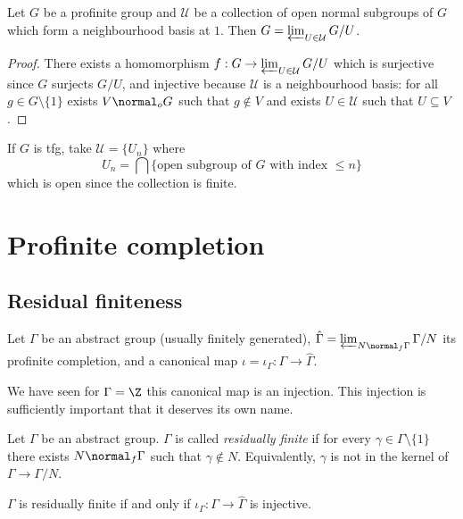 \documentclass[a4paper]{article}
\begin{document}
\begin{proposition}
  Let \(G\) be a profinite group and \(\mathcal U\) be a collection of open normal subgroups of \(G\) which form a neighbourhood basis at \(1\). Then \(G = \varprojlim_{U \in \mathcal U} G/U\).
\end{proposition}

\begin{proof}
  There exists a homomorphism \(f: G \to \varprojlim_{U \in \mathcal U} G/U\) which is surjective since \(G\) surjects \(G/U\), and injective because \(\mathcal U\) is a neighbourhood basis: for all \(g \in G \setminus \{1\}\) exists \(V \normal_o G\) such that \(g \notin V\) and exists \(U \in \mathcal U\) such that \(U \subseteq V\).
\end{proof}

\begin{eg}
  If \(G\) is tfg, take \(\mathcal U = \{U_n\}\) where
  \[
    U_n = \bigcap \{\text{open subgroup of \(G\) with index \(\leq n\)}\}
  \]
  which is open since the collection is finite.
\end{eg}

\section{Profinite completion}

\subsection{Residual finiteness}

Let \(\Gamma\) be an abstract group (usually finitely generated), \(\hat \Gamma = \varprojlim_{N \normal_f \Gamma} \Gamma/N\) its profinite completion, and a canonical map \(\iota = \iota_\Gamma: \Gamma \to \hat \Gamma\).

We have seen for \(\Gamma = \Z\) this canonical map is an injection. This injection is sufficiently important that it deserves its own name.

\begin{definition}
  Let \(\Gamma\) be an abstract group. \(\Gamma\) is called \emph{residually finite} if for every \(\gamma \in \Gamma \setminus \{1\}\) there exists \(N \normal_f \Gamma\) such that \(\gamma \notin N\). Equivalently, \(\gamma\) is not in the kernel of \(\Gamma \to \Gamma/N\).
\end{definition}

\begin{proposition}
  \(\Gamma\) is residually finite if and only if \(\iota_\Gamma: \Gamma \to \hat \Gamma\) is injective.
\end{proposition}
\end{document}
